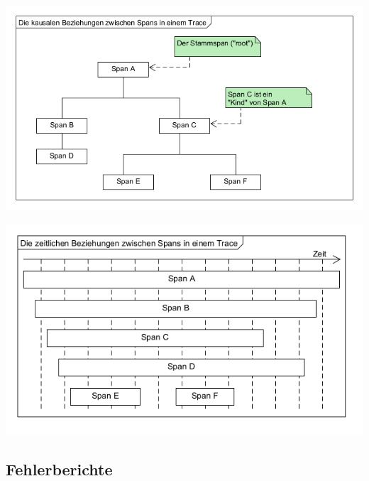 \begin{minipage}{.47\textwidth}
	\centering
	\includegraphics[width=\linewidth]{img/03_methoden/otel_causal-relationship.png}
	\label{fig:otel-causal-relationship}
\end{minipage}%
\hspace{.06\textwidth}
\begin{minipage}{.47\textwidth}
	\centering
	\includegraphics[width=\linewidth]{img/03_methoden/otel_temporal-relationship}
	\label{fig:otel-temporal-relationship}
\end{minipage}

\subsection{Fehlerberichte}

